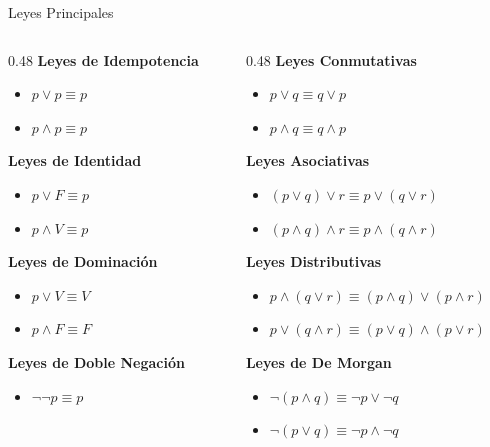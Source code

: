 \documentclass[aspectratio=169,10pt]{beamer}
\begin{document}
\begin{frame}{Leyes Principales}
\begin{columns}
\begin{column}{0.48\textwidth}
\textbf{Leyes de Idempotencia}
\begin{itemize}\small
\item $p \lor p \equiv p$
\item $p \land p \equiv p$
\end{itemize}
\textbf{Leyes de Identidad}
\begin{itemize}\small
\item $p \lor F \equiv p$
\item $p \land V \equiv p$
\end{itemize}
\textbf{Leyes de Dominación}
\begin{itemize}\small
\item $p \lor V \equiv V$
\item $p \land F \equiv F$
\end{itemize}
\textbf{Leyes de Doble Negación}
\begin{itemize}\small
\item $\neg\neg p \equiv p$
\end{itemize}
\end{column}
\begin{column}{0.48\textwidth}
\textbf{Leyes Conmutativas}
\begin{itemize}\small
\item $p \lor q \equiv q \lor p$
\item $p \land q \equiv q \land p$
\end{itemize}
\textbf{Leyes Asociativas}
\begin{itemize}\small
\item $(p\lor q)\lor r \equiv p\lor(q\lor r)$
\item $(p\land q)\land r \equiv p\land(q\land r)$
\end{itemize}
\textbf{Leyes Distributivas}
\begin{itemize}\small
\item $p\land(q\lor r) \equiv (p\land q)\lor(p\land r)$
\item $p\lor(q\land r) \equiv (p\lor q)\land(p\lor r)$
\end{itemize}
\textbf{Leyes de De Morgan}
\begin{itemize}\small
\item $\neg(p\land q) \equiv \neg p \lor \neg q$
\item $\neg(p\lor q) \equiv \neg p \land \neg q$
\end{itemize}
\end{column}
\end{columns}
\end{frame}
\end{document}
